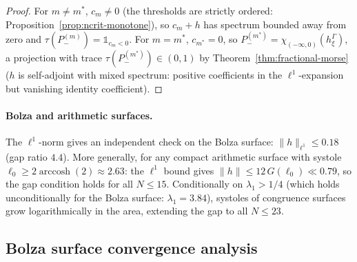 \begin{proof}
For $m \ne m^*$, $c_m \ne 0$ (the thresholds are
strictly ordered: Proposition~\ref{prop:ncrit-monotone}),
so $c_m + h$ has spectrum bounded away from zero
and $\tau(P_-^{(m)}) = \mathbb{1}_{c_m < 0}$.
For $m = m^*$, $c_{m^*} = 0$, so
$P_-^{(m^*)} = \chi_{(-\infty,0)}(h_\xi^\Gamma)$,
a projection with trace
$\tau(P_-^{(m^*)}) \in (0, 1)$
by Theorem~\ref{thm:fractional-morse}
($h$ is self-adjoint with mixed spectrum:
positive coefficients in the $\ell^1$-expansion
but vanishing identity coefficient).
\end{proof}

\paragraph{Bolza and arithmetic surfaces.}
The $\ell^1$-norm gives an independent check on the Bolza surface:
$\|h\|_{\ell^1} \le 0.18$ (gap ratio $4.4$).
More generally, for any compact arithmetic surface with
systole $\ell_0 \ge 2\operatorname{arccosh}(2) \approx 2.63$:
the $\ell^1$ bound gives
$\|h\| \le 12\,G(\ell_0) \ll 0.79$, so the gap condition
holds for all $N \le 15$.
Conditionally on $\lambda_1 > 1/4$ (which holds unconditionally for the Bolza surface: $\lambda_1 = 3.84$),
systoles of congruence surfaces grow logarithmically
in the area, extending the gap to all $N \le 23$.

\subsection{Bolza surface convergence analysis}
\label{sec:bolza-convergence}

